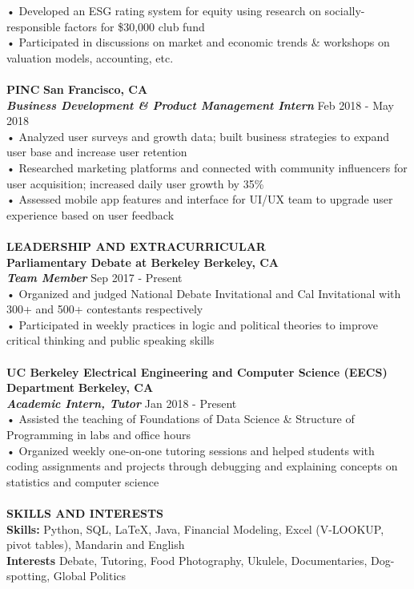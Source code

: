 \documentclass[10.5pt]{article}
\begin{document}
• Developed an ESG rating system for equity using research on socially-responsible factors for \$30,000 club fund\\
• Participated in discussions on market and economic trends \& workshops on valuation models, accounting, etc.
\\~\\
\textbf{PINC} 
\hfill
\textbf{San Francisco, CA}\\
\textbf{\textit{Business Development \& Product Management Intern}}
\hfill
Feb 2018 - May 2018\\
• Analyzed user surveys and growth data; built business strategies to expand user base and increase user retention\\
• Researched marketing platforms and connected with community influencers for user acquisition; increased daily user growth by 35\%\\
• Assessed mobile app features and interface for UI/UX team to upgrade user experience based on user feedback
\\~\\

\textbf{\large{LEADERSHIP AND EXTRACURRICULAR}}\\

\textbf{Parliamentary Debate at Berkeley} 
\hfill
\textbf{Berkeley, CA}\\
\textbf{\textit{Team Member}}
\hfill
Sep 2017 - Present\\
• Organized and judged National Debate Invitational and Cal Invitational with 300+ and 500+ contestants respectively\\
• Participated in weekly practices in logic and political theories to improve critical thinking and public speaking skills
\\~\\
\textbf{UC Berkeley Electrical Engineering and Computer Science (EECS) Department} 
\hfill
\textbf{Berkeley, CA}\\
\textbf{\textit{Academic Intern, Tutor}}
\hfill
Jan 2018 - Present\\
• Assisted the teaching of Foundations of Data Science \& Structure of Programming in labs and office hours\\
• Organized weekly one-on-one tutoring sessions and helped  students with coding assignments and projects through debugging and explaining concepts on statistics and computer science
\\~\\

\textbf{\large{SKILLS AND INTERESTS}}\\
\textbf{Skills:}
Python, SQL, LaTeX, Java, Financial Modeling, Excel (V-LOOKUP, pivot tables), Mandarin and English\\
\textbf{Interests}
Debate, Tutoring, Food Photography, Ukulele, Documentaries, Dog-spotting, Global Politics
\end{document}
